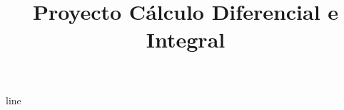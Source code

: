 \documentclass[stu]{apa7}
\title{Proyecto Cálculo Diferencial e Integral}
\begin{document}
\maketitle line
\end{document}
